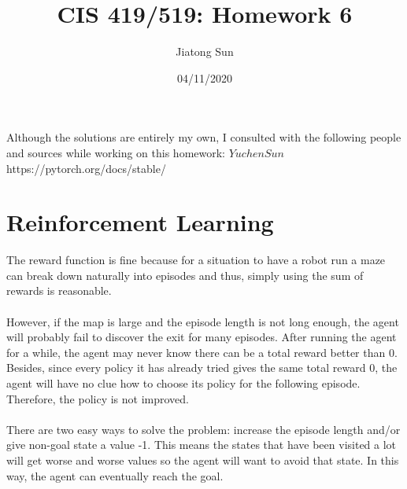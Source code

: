 \documentclass{article}
\title{CIS 419/519: Homework 6}
\author{Jiatong Sun}
\date{04/11/2020}
\begin{document}
    \maketitle
    \noindent
    Although the solutions are entirely my own, I consulted with the following people and sources while working on this homework: $Yuchen Sun$\\
    https://pytorch.org/docs/stable/
    
    \section{Reinforcement Learning \uppercase\expandafter{}}
    \noindent
    The reward function is fine because for a situation to have a robot run a maze can break down naturally into episodes and thus, simply using the sum of rewards is reasonable.\\\\
    However, if the map is large and the episode length is not long enough, the agent will probably fail to discover the exit for many episodes. After running the agent for a while, the agent may never know there can be a total reward better than 0. Besides, since every policy it has already tried gives the same total reward 0, the agent will have no clue how to choose its policy for the following episode. Therefore, the policy is not improved.\\\\
    There are two easy ways to solve the problem: increase the episode length and/or give non-goal state a value -1. This means the states that have been visited a lot will get worse and worse values so the agent will want to avoid that state. In this way, the agent can eventually reach the goal.
        
\end{document}
